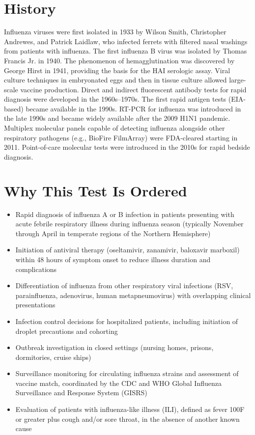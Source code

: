 \section*{History}
Influenza viruses were first isolated in 1933 by Wilson Smith, Christopher Andrewes, and Patrick Laidlaw, who infected ferrets with filtered nasal washings from patients with influenza. The first influenza B virus was isolated by Thomas Francis Jr. in 1940. The phenomenon of hemagglutination was discovered by George Hirst in 1941, providing the basis for the HAI serologic assay. Viral culture techniques in embryonated eggs and then in tissue culture allowed large-scale vaccine production. Direct and indirect fluorescent antibody tests for rapid diagnosis were developed in the 1960s--1970s. The first rapid antigen tests (EIA-based) became available in the 1990s. RT-PCR for influenza was introduced in the late 1990s and became widely available after the 2009 H1N1 pandemic. Multiplex molecular panels capable of detecting influenza alongside other respiratory pathogens (e.g., BioFire FilmArray) were FDA-cleared starting in 2011. Point-of-care molecular tests were introduced in the 2010s for rapid bedside diagnosis.

\section*{Why This Test Is Ordered}
\begin{itemize}
  \item Rapid diagnosis of influenza A or B infection in patients presenting with acute febrile respiratory illness during influenza season (typically November through April in temperate regions of the Northern Hemisphere)
  \item Initiation of antiviral therapy (oseltamivir, zanamivir, baloxavir marboxil) within 48 hours of symptom onset to reduce illness duration and complications
  \item Differentiation of influenza from other respiratory viral infections (RSV, parainfluenza, adenovirus, human metapneumovirus) with overlapping clinical presentations
  \item Infection control decisions for hospitalized patients, including initiation of droplet precautions and cohorting
  \item Outbreak investigation in closed settings (nursing homes, prisons, dormitories, cruise ships)
  \item Surveillance monitoring for circulating influenza strains and assessment of vaccine match, coordinated by the CDC and WHO Global Influenza Surveillance and Response System (GISRS)
  \item Evaluation of patients with influenza-like illness (ILI), defined as fever 100\textdegree{}F or greater plus cough and/or sore throat, in the absence of another known cause
\end{itemize}

